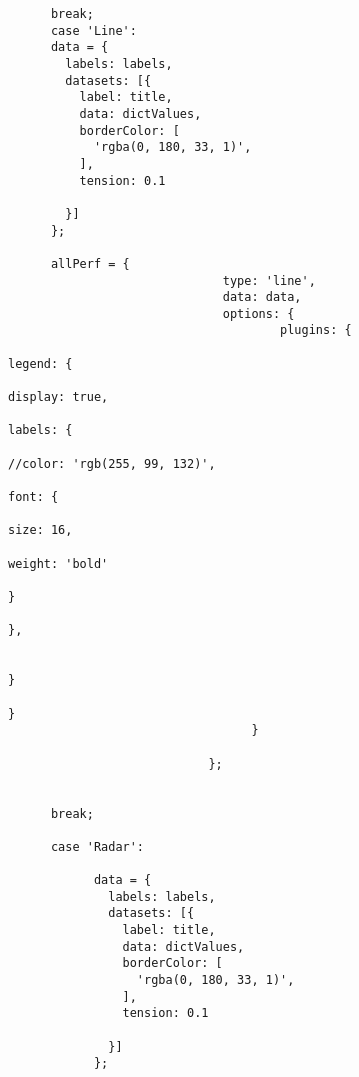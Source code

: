 \begin{lstlisting}
      break;
      case 'Line':
      data = {
        labels: labels,
        datasets: [{
          label: title,
          data: dictValues,
          borderColor: [
            'rgba(0, 180, 33, 1)',
          ],
          tension: 0.1

        }]
      };

      allPerf = {
                              type: 'line',
                              data: data,
                              options: {
                                      plugins: {
                                                                                      legend: {
                                                                                          display: true,
                                                                                          labels: {
                                                                                              //color: 'rgb(255, 99, 132)',
                                                                                               font: {
                                                                                                  size: 16,
                                                                                                  weight: 'bold'
                                                                                               }
                                                                                          },

                                                                                      }
                                                                                  }
                                  }

                            };


      break;

      case 'Radar':

            data = {
              labels: labels,
              datasets: [{
                label: title,
                data: dictValues,
                borderColor: [
                  'rgba(0, 180, 33, 1)',
                ],
                tension: 0.1

              }]
            };


\end{lstlisting}
